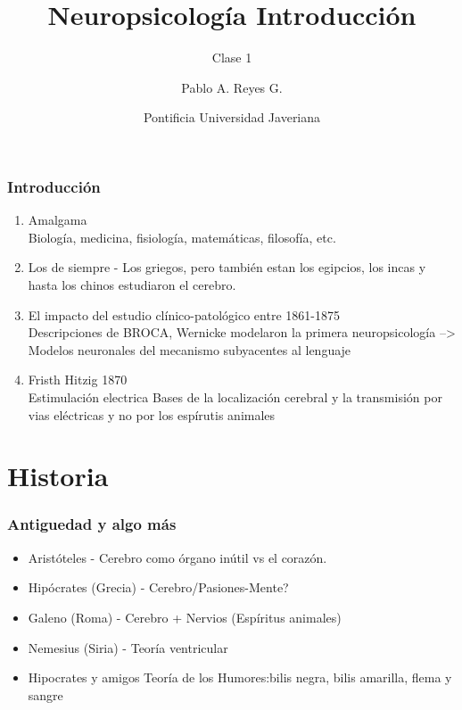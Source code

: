\documentclass{beamer}
\title{Neuropsicología Introducción}
\subtitle{\large Clase 1}
\author{Pablo A. Reyes G.}
\date{Pontificia Universidad Javeriana}
\begin{document}
	\setcounter{showProgressBar}{0}
	\setcounter{showSlideNumbers}{0}
	\frame{\titlepage}


	\begin{frame}
	\transfade
		\frametitle{Introducción}

				\begin{enumerate}
					\item Amalgama\\ \textcolor{ExecusharesGrey}{\hspace{1em}Biología, medicina, fisiología, matemáticas, filosofía, etc.}
					\pause
					\item Los de siempre - Los griegos, pero también estan los egipcios, los incas y hasta los chinos estudiaron el cerebro.
					\pause
					\item El impacto del estudio clínico-patológico entre 1861-1875  \\ \textcolor{ExecusharesGrey}{\hspace{1em}Descripciones de BROCA, Wernicke modelaron la primera neuropsicología --> Modelos neuronales del mecanismo subyacentes al lenguaje}
					\pause
					\item Fristh Hitzig 1870 \\ \textcolor{ExecusharesGrey}{\hspace{1em}Estimulación electrica \hspace{1em}Bases de la localización cerebral y la transmisión por vias eléctricas y no por los espírutis animales}
				\end{enumerate}	
	\end{frame}
	
	\setcounter{framenumber}{0}
	\setcounter{showProgressBar}{1}
	\setcounter{showSlideNumbers}{1}
		
\section{Historia}

		\begin{frame}
		\transfade
			\frametitle{Antiguedad y algo más}
			\begin{itemize}
				\item Aristóteles - Cerebro como órgano inútil vs el corazón.
				\pause
				\item Hipócrates (Grecia) - Cerebro/Pasiones-Mente?
				\pause
				\item Galeno (Roma) - Cerebro + Nervios (Espíritus animales)
				\pause
				\item Nemesius (Siria) - Teoría ventricular
				\pause
				\item Hipocrates y amigos Teoría de los Humores:bilis negra, bilis amarilla, flema y sangre
			\end{itemize}
		\end{frame}
\end{document}

